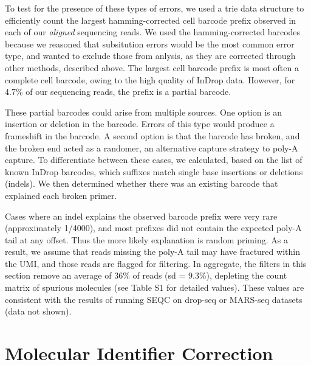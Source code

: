 To test for the presence of these types of errors, we used a {\mono trie} data structure to efficiently count the largest hamming-corrected cell barcode prefix observed in each of our \textit{aligned} sequencing reads. 
We used the hamming-corrected barcodes because we reasoned that subsitution errors would be the most common error type, and wanted to exclude those from anlysis, as they are corrected through other methods, described above. 
The largest cell barcode prefix is most often a complete cell barcode, owing to the high quality of InDrop data. 
However, for 4.7\% of our sequencing reads, the prefix is a partial barcode.  %

These partial barcodes could arise from multiple sources. 
One option is an insertion or deletion in the barcode. 
Errors of this type would produce a frameshift in the barcode. 
A second option is that the barcode has broken, and the broken end acted as a randomer, an alternative capture strategy to poly-A capture. 
To differentiate between these cases, we calculated, based on the list of known InDrop barcodes, which suffixes match single base insertions or deletions (indels). 
We then determined whether there was an existing barcode that explained each broken primer. 

Cases where an indel explains the observed barcode prefix were very rare (approximately 1/4000), and most prefixes did not contain the expected poly-A tail at any offset. 
Thus the more likely explanation is random priming. 
As a result, we assume that reads missing the poly-A tail may have fractured within the UMI, and those reads are flagged for filtering. 
In aggregate, the filters in this section remove an average of 36\% of reads (sd = 9.3\%), depleting the count matrix of spurious molecules (see Table S1 for detailed values). %
These values are consistent with the results of running SEQC on drop-seq or MARS-seq datasets (data not shown).

\section{Molecular Identifier Correction}

